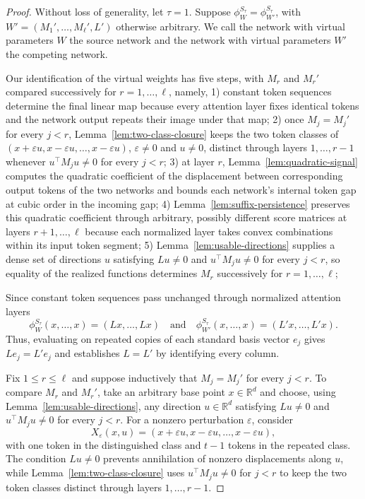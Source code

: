 \documentclass[mlmain]{jmlr}
\newcommand{\R}{\mathbb{R}}
\begin{document}
\begin{proof}
Without loss of generality, let $\tau=1$.  Suppose
$\phi_W^{S_\tau}=\phi_{W'}^{S_\tau}$, with
$W'=(M_1',\ldots,M_\ell',L')$ otherwise arbitrary.
We call the network with virtual parameters $W$ the source network and
the network with virtual parameters $W'$ the competing network.

Our identification of the virtual weights has five steps, with $M_r$ and
$M_r'$ compared successively for $r=1,\ldots,\ell$, namely,
1) constant token sequences determine the final linear map because every
attention layer fixes identical tokens and the network output repeats their
image under that map;
2) once $M_j=M_j'$ for every $j<r$,
Lemma~\ref{lem:two-class-closure} keeps the two token classes of
$(x+\varepsilon u,x-\varepsilon u,\ldots,x-\varepsilon u)$,
$\varepsilon\ne0$ and $u\ne0$, distinct through layers $1,\ldots,r-1$
whenever $u^\top M_j u\ne0$ for every $j<r$;
3) at layer $r$, Lemma~\ref{lem:quadratic-signal} computes the
quadratic coefficient of the displacement between corresponding output
tokens of the two networks and bounds each network's internal token gap at
cubic order in the incoming gap;
4) Lemma~\ref{lem:suffix-persistence} preserves this quadratic coefficient
through arbitrary, possibly different score matrices at layers
$r+1,\ldots,\ell$ because each
normalized layer takes convex combinations within its input token segment;
5) Lemma~\ref{lem:usable-directions} supplies a dense set of directions
$u$ satisfying $Lu\ne0$ and $u^\top M_j u\ne0$ for every $j<r$, so equality
of the realized functions determines $M_r$ successively for
$r=1,\ldots,\ell$;

Since constant token sequences pass unchanged through normalized attention layers 
\begin{equation}
 \phi_W^{S_\tau}(x,\ldots,x)
 =(Lx,\ldots,Lx)
 \quad\text{and}\quad
 \phi_{W'}^{S_\tau}(x,\ldots,x)
 =(L'x,\ldots,L'x).
 \label{eq:constant-recovery-proof}
\end{equation}
Thus, evaluating on repeated copies of each standard basis vector $e_j$ gives
$Le_j=L'e_j$ and establishes $L=L'$ by identifying every column.

Fix $1\le r\le\ell$ and suppose inductively that $M_j=M_j'$ for every
$j<r$.  To compare $M_r$ and $M_r'$, take an arbitrary base point
$x\in\R^d$ and choose, using Lemma~\ref{lem:usable-directions}, any
direction $u\in\R^d$ satisfying $Lu\ne0$ and $u^\top M_j u\ne0$ for
every $j<r$.  For a nonzero perturbation
$\varepsilon$, consider
\begin{equation}
 X_\varepsilon(x,u)
 =(x+\varepsilon u,x-\varepsilon u,\ldots,x-\varepsilon u),
 \label{eq:centered-probe-proof}
\end{equation}
with one token in the distinguished class and $t-1$ tokens in the repeated
class.  The condition $Lu\ne0$ prevents annihilation of nonzero
displacements along $u$, while Lemma~\ref{lem:two-class-closure} uses
$u^\top M_j u\ne0$ for $j<r$ to keep the two token classes distinct
through layers $1,\ldots,r-1$.


\end{proof}
\end{document}
